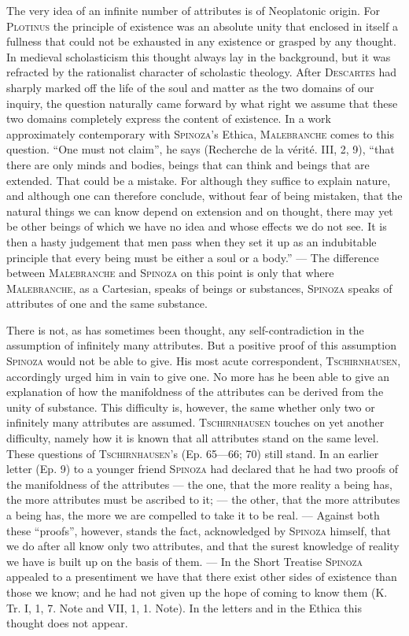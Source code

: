 \documentclass[12pt]{article}
\begin{document}
The very idea of an infinite number of attributes is of Neoplatonic origin. For
\textsc{Plotinus} the principle of existence was an absolute unity that enclosed in
itself a fullness that could not be exhausted in any existence or grasped by any
thought. In medieval scholasticism this thought always lay in the background, but it
was refracted by the rationalist character of scholastic theology. After
\textsc{Descartes} had sharply marked off the life of the soul and matter as the two
domains of our inquiry, the question naturally came forward by what right we assume
that these two domains completely express the content of existence. In a work
approximately contemporary with \textsc{Spinoza}'s Ethica, \textsc{Malebranche} comes
to this question. ``One must not claim'', he says (Recherche de la vérité. III, 2, 9),
``that there are only minds and bodies, beings that can think and beings that are
extended. That could be a mistake. For although they suffice to explain nature, and
although one can therefore conclude, without fear of being mistaken, that the natural
things we can know depend on extension and on thought, there may yet be other beings
of which we have no idea and whose effects we do not see. It is then a hasty judgement
that men pass when they set it up as an indubitable principle that every being must be
either a soul or a body.'' --- The difference between \textsc{Malebranche} and
\textsc{Spinoza} on this point is only that where \textsc{Malebranche}, as a
Cartesian, speaks of beings or substances, \textsc{Spinoza} speaks of attributes of one
and the same substance.

There is not, as has sometimes been thought, any self-contradiction in the assumption
of infinitely many attributes. But a positive proof of this assumption
\textsc{Spinoza} would not be able to give. His most acute correspondent,
\textsc{Tschirnhausen}, accordingly urged him in vain to give one. No more has he been
able to give an explanation of how the manifoldness of the attributes can be derived
from the unity of substance. This difficulty is, however, the same whether only two or
infinitely many attributes are assumed. \textsc{Tschirnhausen} touches on yet another
difficulty, namely how it is known that all attributes stand on the same level. These
questions of \textsc{Tschirnhausen}'s (Ep. 65---66; 70) still stand. In an earlier
letter (Ep. 9) to a younger friend \textsc{Spinoza} had declared that he had two proofs
of the manifoldness of the attributes --- the one, that the more reality a being has,
the more attributes must be ascribed to it; --- the other, that the more attributes a
being has, the more we are compelled to take it to be real. --- Against both these
``proofs'', however, stands the fact, acknowledged by \textsc{Spinoza} himself, that we
do after all know only two attributes, and that the surest knowledge of reality we have
is built up on the basis of them. %
--- In the Short Treatise \textsc{Spinoza} appealed to a presentiment we have that there
exist other sides of existence than those we know; and he had not given up the hope of
coming to know them (K. Tr. I, 1, 7. Note and VII, 1, 1. Note). In the letters and in
the Ethica this thought does not appear.
\end{document}

